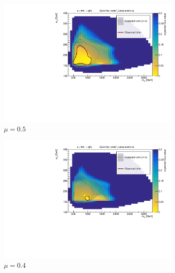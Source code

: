 \captionsetup[figure]{list=no}

 \begin{figure} \ContinuedFloat
  \begin{subfigure}{0.48\textwidth}
    \includegraphics[width=\textwidth]{Figures/App_signal_strength/unblinded_mu0_5_nosig.pdf}
    \caption{\(\mu=0.5\)}\label{fig:unblinded_0.5}
  \end{subfigure} \hspace{0.3em}
  \begin{subfigure}{0.48\textwidth}
    \includegraphics[width=\textwidth]{Figures/App_signal_strength/unblinded_mu0_4_nosig.pdf}
    \caption{\(\mu=0.4\)}\label{fig:unblinded_0.4}
  \end{subfigure} \vspace{1em}  
    \begin{subfigure}{0.48\textwidth}

\end{subfigure}
\end{figure}
